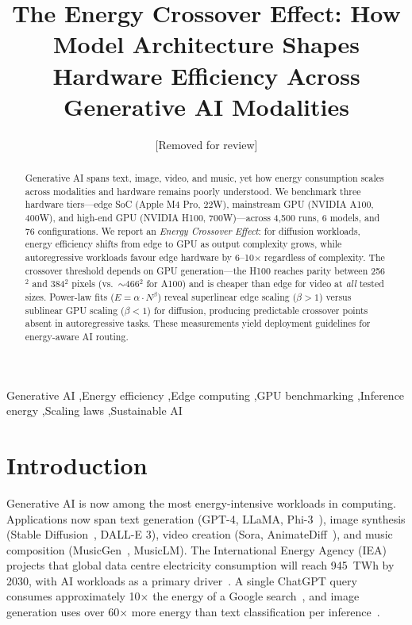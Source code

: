 \documentclass[preprint,12pt]{elsarticle}
\begin{document}
\begin{frontmatter}

\title{The Energy Crossover Effect: How Model Architecture Shapes Hardware Efficiency Across Generative AI Modalities}

\author{[Removed for review]}








\address{[Removed for review]}


\begin{abstract}
Generative AI spans text, image, video, and music, yet how energy consumption scales across modalities and hardware remains poorly understood. We benchmark three hardware tiers---edge SoC (Apple M4 Pro, 22W), mainstream GPU (NVIDIA A100, 400W), and high-end GPU (NVIDIA H100, 700W)---across 4,500 runs, 6 models, and 76 configurations. We report an \textit{Energy Crossover Effect}: for diffusion workloads, energy efficiency shifts from edge to GPU as output complexity grows, while autoregressive workloads favour edge hardware by 6--10$\times$ regardless of complexity. The crossover threshold depends on GPU generation---the H100 reaches parity between 256$^2$ and 384$^2$ pixels (vs.\ $\sim$466$^2$ for A100) and is cheaper than edge for video at \textit{all} tested sizes. Power-law fits ($E = \alpha \cdot N^\beta$) reveal superlinear edge scaling ($\beta > 1$) versus sublinear GPU scaling ($\beta < 1$) for diffusion, producing predictable crossover points absent in autoregressive tasks. These measurements yield deployment guidelines for energy-aware AI routing.
\end{abstract}

\begin{keyword}
Generative AI \sep Energy efficiency \sep Edge computing \sep GPU benchmarking \sep Inference energy \sep Scaling laws \sep Sustainable AI
\end{keyword}

\end{frontmatter}

\section{Introduction}
\label{sec:introduction}

Generative AI is now among the most energy-intensive workloads in computing. Applications now span text generation (GPT-4, LLaMA, Phi-3~\cite{abdin2024phi3}), image synthesis (Stable Diffusion~\cite{rombach2022high}, DALL-E 3), video creation (Sora, AnimateDiff~\cite{guo2024animatediff}), and music composition (MusicGen~\cite{copet2024musicgen}, MusicLM). The International Energy Agency (IEA) projects that global data centre electricity consumption will reach 945~TWh by 2030, with AI workloads as a primary driver~\cite{iea2024}. A single ChatGPT query consumes approximately 10$\times$ the energy of a Google search~\cite{devries2023growing}, and image generation uses over 60$\times$ more energy than text classification per inference~\cite{luccioni2024power}.
\end{document}
